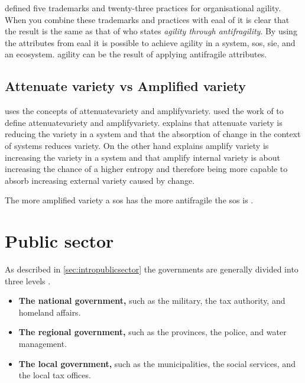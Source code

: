\textcite[p.~7]{Aghina2018} defined five trademarks and twenty-three practices for organisational \gls{agility}. When you combine these trademarks and practices with \acrfull{eaal} of \textcite[p.~69]{Botjes2020} it is clear that the result is the same as that of \textcite[Abstract]{OReilly2019} who states \textit{\Gls{agility} through \Gls{antifragility}}. By using the attributes from \acrshort{eaal} it is possible to achieve \gls{agility} in a system, \acrlong{sos}, \acrlong{sie}, and an ecosystem. \Gls{agility} can be the result of applying \gls{antifragile} attributes.

\subsection{Attenuate variety vs Amplified variety}
\label{sub:attenuatevsaplify}

\textcite[p.~4]{Botjes2021} uses the concepts of \gls{attenuatevariety} and \gls{amplifyvariety}. \textcite[p.~4]{Botjes2021} used the work of \textcites{Ashby1979}{Beer1994} to define \gls{attenuatevariety} and \gls{amplifyvariety}. \textcite[p.~4]{Botjes2021} explains that attenuate variety is reducing the variety in a system and that the absorption of change in the context of systems reduces variety. On the other hand \textcite[p.~4]{Botjes2021} explains amplify variety is increasing the variety in a system and that amplify internal variety is about increasing the chance of a higher entropy and therefore being more capable to absorb increasing external variety caused by change. 

The more amplified variety a \acrshort{sos} has the more antifragile the \acrshort{sos} is \needsref.


\section{Public sector}
\label{sec:tbpublicsector}


As described in \cref{sec:intropublicsector}  the governments are generally divided into three levels \parencite{PrivacySense2016}.

\begin{itemize}
	\item{\textbf{The national government,} such as the military, the tax authority, and homeland affairs.}
	\item{\textbf{The regional government,} such as the provinces, the police, and water management.}
	\item{\textbf{The local government,} such as the municipalities, the social services, and the local tax offices.}
\end{itemize}


